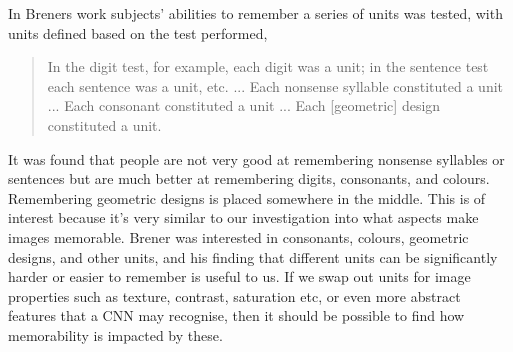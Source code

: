 \documentclass{UoYCSproject}
\begin{document}
% 



In Breners work \cite{BrenerMemorySpan} subjects' abilities to remember a series of units was tested, with units defined based on the test performed, 
\begin{quote}
    In the digit test, for example, each digit was a unit; in the sentence test each sentence was a unit, etc. ... Each nonsense syllable constituted a unit ... Each consonant constituted a unit ... Each [geometric] design constituted a unit. \cite[p.468]{BrenerMemorySpan}
\end{quote}

It was found that people are not very good at remembering nonsense syllables or sentences but are much better at remembering digits, consonants, and colours. Remembering geometric designs is placed somewhere in the middle. This is of interest because it's very similar to our investigation into what aspects make images memorable. Brener was interested in consonants, colours, geometric designs, and other units, and his finding that different units can be significantly harder or easier to remember is useful to us. If we swap out units for image properties such as texture, contrast, saturation etc, or even more abstract features that a CNN may recognise, then it should be possible to find how memorability is impacted by these.   
\end{document}
